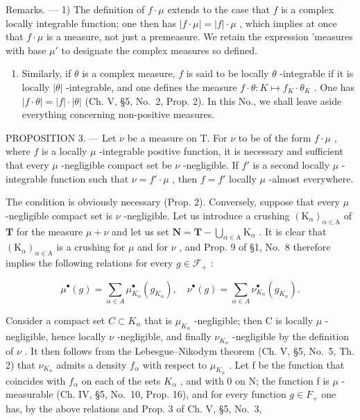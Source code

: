 Remarks. --- 1) The definition of \(f \cdot \mu\) extends to the case that \(f\) is a complex locally integrable function; one then has \(|f \cdot \mu| = |f| \cdot \mu\) , which implies at once that \(f \cdot \mu\) is a measure, not just a premeasure. We retain the expression 'measures with base \(\mu'\) to designate the complex measures so defined.

\begin{enumerate}
\def\labelenumi{\arabic{enumi})}
\setcounter{enumi}{1}
\tightlist
\item
  Similarly, if \(\theta\) is a complex measure, \(f\) is said to be locally \(\theta\) -integrable if it is locally \(|\theta|\) -integrable, and one defines the measure \(f \cdot \theta : K \mapsto f_K \cdot \theta_K\) . One has \(|f \cdot \theta| = |f| \cdot |\theta|\) (Ch. V, §5, No.~2, Prop. 2). In this No., we shall leave aside everything concerning non-positive measures.
\end{enumerate}

PROPOSITION 3. --- Let \(\nu\) be a measure on T. For \(\nu\) to be of the form \(f \cdot \mu\) , where \(f\) is a locally \(\mu\) -integrable positive function, it is necessary and sufficient that every \(\mu\) -negligible compact set be \(\nu\) -negligible. If \(f'\) is a second locally \(\mu\) -integrable function such that \(\nu = f' \cdot \mu\) , then \(f = f'\) locally \(\mu\) -almost everywhere.

The condition is obviously necessary (Prop. 2). Conversely, suppose that every \(\mu\) -negligible compact set is \(\nu\) -negligible. Let us introduce a crushing \((\mathrm{K}_{\alpha})_{\alpha \in \mathrm{A}}\) of \(\mathbf{T}\) for the measure \(\mu + \nu\) and let us set \(\mathbf{N} = \mathbf{T} - \bigcup_{\alpha \in \mathrm{A}} \mathrm{K}_{\alpha}\) . It is clear that \((\mathrm{K}_{\alpha})_{\alpha \in \mathrm{A}}\) is a crushing for \(\mu\) and for \(\nu\) , and Prop. 9 of §1, No.~8 therefore implies the following relations for every \(g \in \mathcal{F}_+\) :

\[
\mu^ {\bullet} (g) = \sum_ {\alpha \in A} \mu_ {K _ {\alpha}} ^ {\bullet} \left(g _ {K _ {\alpha}}\right), \quad \nu^ {\bullet} (g) = \sum_ {\alpha \in A} \nu_ {K _ {\alpha}} ^ {\bullet} \left(g _ {K _ {\alpha}}\right).
\]

Consider a compact set \(C \subset K_{\alpha}\) that is \(\mu_{K_{\alpha}}\) -negligible; then C is locally \(\mu\) -negligible, hence locally \(\nu\) -negligible, and finally \(\nu_{K_{\alpha}}\) -negligible by the definition of \(\nu\) . It then follows from the Lebesgue--Nikodym theorem (Ch. V, §5, No.~5, Th. 2) that \(\nu_{K_{\alpha}}\) admits a density \(f_{\alpha}\) with respect to \(\mu_{K_{\alpha}}\) . Let f be the function that coincides with \(f_{\alpha}\) on each of the sets \(K_{\alpha}\) , and with 0 on N; the function f is \(\mu\) -measurable (Ch. IV, §5, No.~10, Prop. 16), and for every function \(g \in F_{+}\) one has, by the above relations and Prop. 3 of Ch. V, §5, No.~3,

